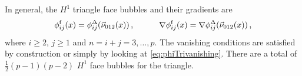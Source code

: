 

In general, the $H^1$ triangle face bubbles and their gradients are
\begin{equation}
	\phi_{ij}^\mathrm{f}(x)=\phi_{ij}^\Delta(\vec{\nu}_{012}(x))\,,\qquad\quad
		\nabla\phi_{ij}^\mathrm{f}(x)=\nabla\phi_{ij}^\Delta(\vec{\nu}_{012}(x))\,,
\label{eq:H1_CountingTriFace}
\end{equation}
where $i\geq2$, $j\geq1$ and $n=i+j=3,\ldots,p$. 
The vanishing conditions are satisfied by construction or simply by looking at \eqref{eq:phiTrivanishing}. 
There are a total of $\frac{1}{2}(p-1)(p-2)$ $H^1$ face bubbles for the triangle.


